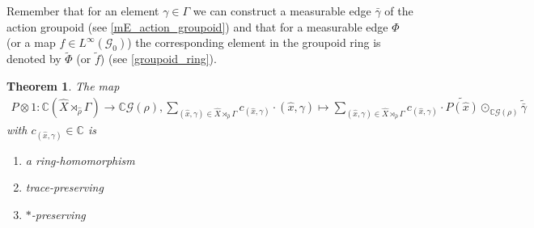 \documentclass[12pt,a4paper]{scrartcl}
\theoremstyle{plain}
\newtheorem{Theorem}{Theorem}[subsection]
\theoremstyle{definition}
\newcommand{\C}{\mathbb{C}} %
\newcommand{\2}{\mathbb{Z} / 2 \mathbb{Z}}
\newcommand{\G}{\mathcal{G}}
\newcommand{\1}{\bar{1}}
\newcommand{\0}{\bar{0}}
\begin{document}
Remember that for an element $\gamma \in \Gamma$ we can construct a measurable edge $\bar{\gamma}$ of the action groupoid (see \ref{mE_action_groupoid}) and that for a measurable edge $\Phi$ (or a map $f \in L^\infty (\G_0)$) the corresponding element in the groupoid ring is denoted by $\tilde{\Phi}$ (or $\tilde{f}$) (see \ref{groupoid_ring}).
\begin{Theorem}\label{map_pantryagin}
	The map 
	\begin{align*}
		P \otimes 1\colon\C(\hat{X} \rtimes_{\hat{\rho}} \Gamma) \to \C\G(\rho), 
		\sum_{(\hat{x}, \gamma) \in \hat{X} \rtimes_{\hat{\rho}} \Gamma}
		 c_{(\hat{x}, \gamma)} \cdot (\hat{x}, \gamma) \mapsto 
		 \sum_{(\hat{x}, \gamma) \in \hat{X} \rtimes_{\hat{\rho}} \Gamma} 
		 c_{(\hat{x}, \gamma)} \cdot \widetilde{P(\hat{x})} \odot_{\C\G(\rho)} \widetilde{\bar{\gamma}} 
	\end{align*}
	 with $c_{(\hat{x}, \gamma)} \in \C$ is
	\begin{enumerate}
		\item a ring-homomorphism \label{i}
		\item trace-preserving \label{ii}
		\item $*$-preserving \label{iii}
	\end{enumerate}
\end{Theorem} 
\end{document}
